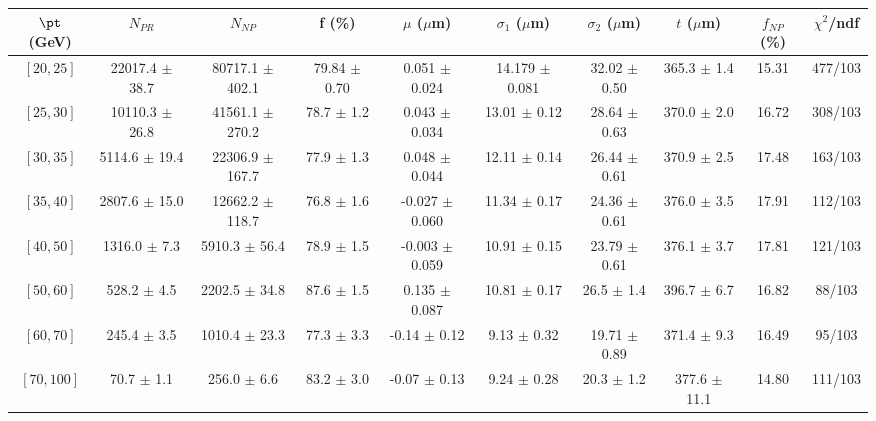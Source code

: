 \begin{tabular}{c||c|c|c|c|c|c|c||c|c}
$\pt$ (GeV) & $N_{PR}$ & $N_{NP}$ & f (\%) & $\mu$ ($\mu$m) & $\sigma_1$ ($\mu$m) & $\sigma_2$ ($\mu$m)  & $t$ ($\mu$m) & $f_{NP}$ (\%) & $\chi^2$/ndf \\
\hline
$[20, 25]$ & 22017.4 $\pm$ 38.7 & 80717.1 $\pm$ 402.1 & 79.84 $\pm$ 0.70 & 0.051 $\pm$ 0.024 & 14.179 $\pm$ 0.081 & 32.02 $\pm$ 0.50 & 365.3 $\pm$ 1.4 & 15.31 & 477/103\\
$[25, 30]$ & 10110.3 $\pm$ 26.8 & 41561.1 $\pm$ 270.2 & 78.7 $\pm$ 1.2 & 0.043 $\pm$ 0.034 & 13.01 $\pm$ 0.12 & 28.64 $\pm$ 0.63 & 370.0 $\pm$ 2.0 & 16.72 & 308/103\\
$[30, 35]$ & 5114.6 $\pm$ 19.4 & 22306.9 $\pm$ 167.7 & 77.9 $\pm$ 1.3 & 0.048 $\pm$ 0.044 & 12.11 $\pm$ 0.14 & 26.44 $\pm$ 0.61 & 370.9 $\pm$ 2.5 & 17.48 & 163/103\\
$[35, 40]$ & 2807.6 $\pm$ 15.0 & 12662.2 $\pm$ 118.7 & 76.8 $\pm$ 1.6 & -0.027 $\pm$ 0.060 & 11.34 $\pm$ 0.17 & 24.36 $\pm$ 0.61 & 376.0 $\pm$ 3.5 & 17.91 & 112/103\\
$[40, 50]$ & 1316.0 $\pm$ 7.3 & 5910.3 $\pm$ 56.4 & 78.9 $\pm$ 1.5 & -0.003 $\pm$ 0.059 & 10.91 $\pm$ 0.15 & 23.79 $\pm$ 0.61 & 376.1 $\pm$ 3.7 & 17.81 & 121/103\\
$[50, 60]$ & 528.2 $\pm$ 4.5 & 2202.5 $\pm$ 34.8 & 87.6 $\pm$ 1.5 & 0.135 $\pm$ 0.087 & 10.81 $\pm$ 0.17 & 26.5 $\pm$ 1.4 & 396.7 $\pm$ 6.7 & 16.82 & 88/103\\
$[60, 70]$ & 245.4 $\pm$ 3.5 & 1010.4 $\pm$ 23.3 & 77.3 $\pm$ 3.3 & -0.14 $\pm$ 0.12 & 9.13 $\pm$ 0.32 & 19.71 $\pm$ 0.89 & 371.4 $\pm$ 9.3 & 16.49 & 95/103\\
$[70, 100]$ & 70.7 $\pm$ 1.1 & 256.0 $\pm$ 6.6 & 83.2 $\pm$ 3.0 & -0.07 $\pm$ 0.13 & 9.24 $\pm$ 0.28 & 20.3 $\pm$ 1.2 & 377.6 $\pm$ 11.1 & 14.80 & 111/103\\
\end{tabular}
